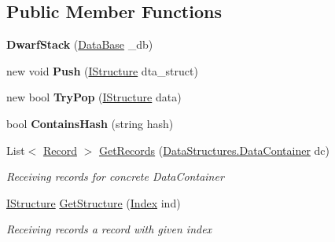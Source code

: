 \subsection*{Public Member Functions}
\begin{DoxyCompactItemize}
\item 
\hypertarget{class_dwarf_d_b_1_1_stack_1_1_dwarf_stack_ad48677010f3ce3899b9467616fd9a7ee}{{\bfseries Dwarf\+Stack} (\hyperlink{class_dwarf_d_b_1_1_data_structures_1_1_data_base}{Data\+Base} \+\_\+db)}\label{class_dwarf_d_b_1_1_stack_1_1_dwarf_stack_ad48677010f3ce3899b9467616fd9a7ee}

\item 
\hypertarget{class_dwarf_d_b_1_1_stack_1_1_dwarf_stack_a885ad9cdfe63a8f8d5c55ffda79b075f}{new void {\bfseries Push} (\hyperlink{interface_dwarf_d_b_1_1_data_structures_1_1_i_structure}{I\+Structure} dta\+\_\+struct)}\label{class_dwarf_d_b_1_1_stack_1_1_dwarf_stack_a885ad9cdfe63a8f8d5c55ffda79b075f}

\item 
\hypertarget{class_dwarf_d_b_1_1_stack_1_1_dwarf_stack_a4b56dab4ce355bf6b5d85861d75a3ca8}{new bool {\bfseries Try\+Pop} (\hyperlink{interface_dwarf_d_b_1_1_data_structures_1_1_i_structure}{I\+Structure} data)}\label{class_dwarf_d_b_1_1_stack_1_1_dwarf_stack_a4b56dab4ce355bf6b5d85861d75a3ca8}

\item 
\hypertarget{class_dwarf_d_b_1_1_stack_1_1_dwarf_stack_ad9a9e05a598682086956db2bfaba217a}{bool {\bfseries Contains\+Hash} (string hash)}\label{class_dwarf_d_b_1_1_stack_1_1_dwarf_stack_ad9a9e05a598682086956db2bfaba217a}

\item 
List$<$ \hyperlink{class_dwarf_d_b_1_1_data_structures_1_1_record}{Record} $>$ \hyperlink{class_dwarf_d_b_1_1_stack_1_1_dwarf_stack_adca3ef11aa4b86f2f6de7f33e06bb13c}{Get\+Records} (\hyperlink{class_dwarf_d_b_1_1_data_structures_1_1_data_container}{Data\+Structures.\+Data\+Container} dc)
\begin{DoxyCompactList}\small\item\em Receiving records for concrete Data\+Container \end{DoxyCompactList}\item 
\hyperlink{interface_dwarf_d_b_1_1_data_structures_1_1_i_structure}{I\+Structure} \hyperlink{class_dwarf_d_b_1_1_stack_1_1_dwarf_stack_a1cf7979ccc18a74d5a2ff3e0205ca2c7}{Get\+Structure} (\hyperlink{class_dwarf_d_b_1_1_data_structures_1_1_index}{Index} ind)
\begin{DoxyCompactList}\small\item\em Receiving records a record with given index \end{DoxyCompactList}\end{DoxyCompactItemize}
